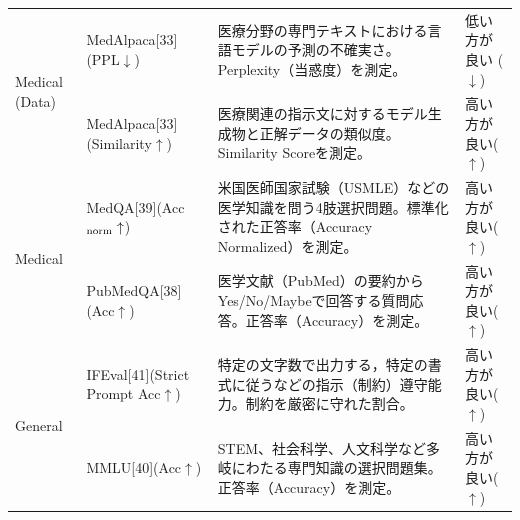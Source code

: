 \documentclass{article}
\begin{document}
\begin{table}[htbp]
\begin{tabularx}{\textwidth}{p{2.0cm}p{3.3cm}Xp{2.2cm}}
\midrule
\multirow{2}{*}{Medical (Data)}
& MedAlpaca[33](PPL$\downarrow$) & 医療分野の専門テキストにおける言語モデルの予測の不確実さ。Perplexity（当惑度）を測定。 & 低い方が良い ($\downarrow$) \\
& MedAlpaca[33](Similarity$\uparrow$) & 医療関連の指示文に対するモデル生成物と正解データの類似度。Similarity Scoreを測定。 & 高い方が良い($\uparrow$) \\
\midrule
\multirow{2}{*}{Medical}
& MedQA[39](Acc$_{\rm norm}\uparrow$) & 米国医師国家試験（USMLE）などの医学知識を問う4肢選択問題。標準化された正答率（Accuracy Normalized）を測定。 & 高い方が良い($\uparrow$) \\
& PubMedQA[38](Acc$\uparrow$) & 医学文献（PubMed）の要約からYes/No/Maybeで回答する質問応答。正答率（Accuracy）を測定。 & 高い方が良い($\uparrow$) \\
\midrule
\multirow{2}{*}{General}
& IFEval[41](Strict Prompt Acc$\uparrow$) & 特定の文字数で出力する，特定の書式に従うなどの指示（制約）遵守能力。制約を厳密に守れた割合。 & 高い方が良い($\uparrow$) \\
& MMLU[40](Acc$\uparrow$) & STEM、社会科学、人文科学など多岐にわたる専門知識の選択問題集。正答率（Accuracy）を測定。 & 高い方が良い($\uparrow$) \\
\bottomrule
\end{tabularx}
\end{table}
\end{document}
